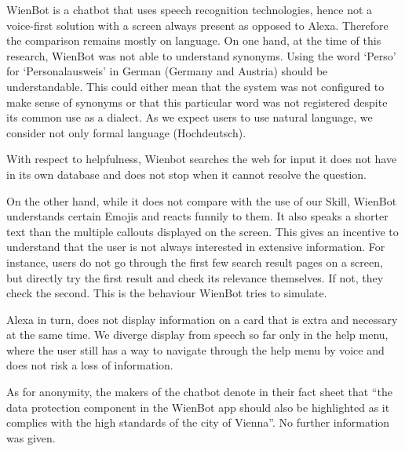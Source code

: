 WienBot is a chatbot that uses speech recognition technologies, hence  not a voice-first solution with a screen always present as opposed to Alexa. Therefore the comparison remains mostly on language.
On one hand, at the time of this research, WienBot was not able to understand synonyms. Using the word `Perso' for `Personalausweis' in German (Germany and Austria) should be understandable. This could either mean that the system was not configured to make sense of synonyms or that this particular word was not registered despite its common use as a dialect.
As we expect users to use natural language, we consider not only formal language (Hochdeutsch).


With respect to helpfulness, Wienbot searches the web for input it does not have in its own database and does not stop when it cannot resolve the question.


On the other hand, while it does not compare with the use of our Skill, WienBot understands certain Emojis and reacts funnily to them. It also speaks a shorter text than the multiple callouts displayed on the screen. This gives an incentive to understand that the user is not always interested in extensive information. For instance, users do not go through the first few search result pages on a screen, but directly try the first result and check its relevance themselves. If not, they check the second. This is the behaviour WienBot tries to simulate.

Alexa in turn, does not display information on a card that is extra and necessary at the same time. We diverge display from speech so far only in the help menu, where the user still has a way to navigate through the help menu by voice and does not risk a loss of information.

As for anonymity, the makers of the chatbot denote in their fact sheet that ``the data protection component in the WienBot app should also be highlighted as it complies with the high standards of the city of Vienna''. No further information was given.

%
%



